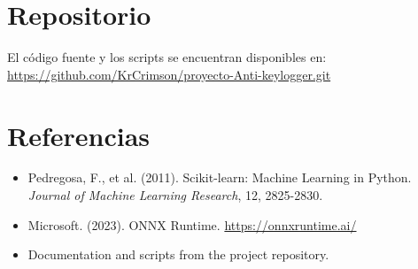 \documentclass{article}
\begin{document}
\section*{Repositorio}
El código fuente y los scripts se encuentran disponibles en: 
\url{https://github.com/KrCrimson/proyecto-Anti-keylogger.git}

\section*{Referencias}
\begin{itemize}
  \item Pedregosa, F., et al. (2011). Scikit-learn: Machine Learning in Python. \textit{Journal of Machine Learning Research}, 12, 2825-2830.
  \item Microsoft. (2023). ONNX Runtime. \url{https://onnxruntime.ai/}
  \item Documentation and scripts from the project repository.
\end{itemize}
\end{document}
